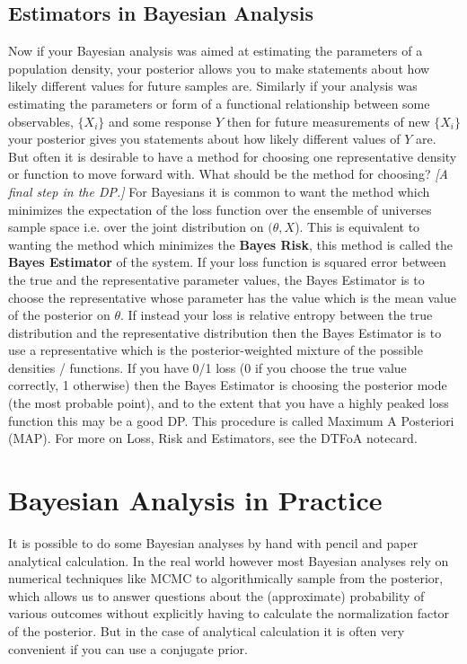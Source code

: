 \subsection{Estimators in Bayesian Analysis}
Now if your Bayesian analysis was aimed at estimating the parameters of a population density, your posterior allows you to make statements about how likely different values for future samples are. Similarly if your analysis was estimating the parameters or form of a functional relationship between some observables, $\{X_i\}$ and some response $Y$ then for future measurements of new $\{X_i\}$ your posterior gives you statements about how likely different values of $Y$ are. But often it is desirable to have a method for choosing one representative density or function to move forward with. What should be the method for choosing? \emph{[A final step in the DP.]} For Bayesians it is common to want the method which minimizes the expectation of the loss function over the ensemble of universes sample space i.e. over the joint distribution on $(\theta, X$). This is equivalent to wanting the method which minimizes the \textbf{Bayes Risk}, this method is called the \textbf{Bayes Estimator} of the system. If your loss function is squared error between the true and the representative parameter values, the Bayes Estimator is to choose the representative whose parameter has the value which is the mean value of the posterior on $\theta$. If instead your loss is relative entropy between the true distribution and the representative distribution then the Bayes Estimator is to use a representative which is the posterior-weighted mixture of the possible densities / functions. If you have 0/1 loss (0 if you choose the true value correctly, 1 otherwise) then the Bayes Estimator is choosing the posterior mode (the most probable point), and to the extent that you have a highly peaked loss function this may be a good DP. This procedure is called Maximum A Posteriori (MAP). For more on Loss, Risk and Estimators, see the DTFoA notecard.

\section{Bayesian Analysis in Practice}
It is possible to do some Bayesian analyses by hand with pencil and paper analytical calculation. In the real world however most Bayesian analyses rely on numerical techniques like MCMC to algorithmically sample from the posterior, which allows us to answer questions about the (approximate) probability of various outcomes without explicitly having to calculate the normalization factor of the posterior. But in the case of analytical calculation it is often very convenient if you can use a conjugate prior. 

